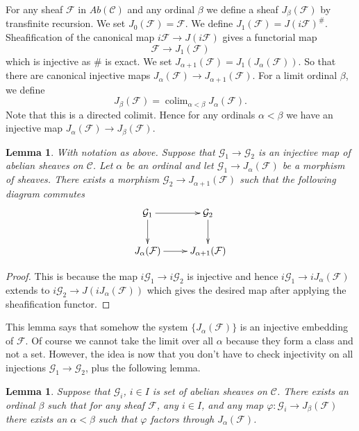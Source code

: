 \documentclass{stacks-project}
\theoremstyle{plain}
\newtheorem{lemma}[subsection]{Lemma}
\theoremstyle{definition}
\theoremstyle{remark}
\numberwithin{equation}{subsection}
\def\colim{\mathop{\mathrm{colim}}\nolimits}
\begin{document}
\medskip\noindent
For any sheaf $\mathcal{F}$ in $\textit{Ab}(\mathcal{C})$ and
any ordinal $\beta$ we define a sheaf
$J_\beta(\mathcal{F})$ by transfinite recursion.
We set $J_0(\mathcal{F}) = \mathcal{F}$.
We define $J_1(\mathcal{F}) = J(i\mathcal{F})^\#$.
Sheafification of the canonical map $i\mathcal{F} \to J(i\mathcal{F})$
gives a functorial map
$$
\mathcal{F} \longrightarrow J_1(\mathcal{F})
$$
which is injective as $\#$ is exact. We set
$J_{\alpha + 1}(\mathcal{F}) = J_1(J_\alpha(\mathcal{F}))$.
So that there are canonical injective maps
$J_\alpha(\mathcal{F}) \to J_{\alpha + 1}(\mathcal{F})$.
For a limit ordinal $\beta$, we define
$$
J_\beta(\mathcal{F}) = \colim_{\alpha < \beta} J_\alpha(\mathcal{F}).
$$
Note that this is a directed colimit. Hence for any ordinals $\alpha < \beta$
we have an injective map $J_\alpha(\mathcal{F}) \to J_\beta(\mathcal{F})$.

\begin{lemma}
\label{lemma-map-into-next-one}
With notation as above.
Suppose that $\mathcal{G}_1 \to \mathcal{G}_2$ is an injective
map of abelian sheaves on $\mathcal{C}$. Let $\alpha$ be an ordinal
and let $\mathcal{G}_1 \to J_\alpha(\mathcal{F})$ be a morphism
of sheaves. There exists a morphism $\mathcal{G}_2 \to
J_{\alpha + 1}(\mathcal{F})$ such that the following diagram commutes
$$
\xymatrix{
\mathcal{G}_1 \ar[d] \ar[r] & \mathcal{G}_2 \ar[d] \\
J_{\alpha}(\mathcal{F}) \ar[r] & J_{\alpha + 1}(\mathcal{F}) }
$$
\end{lemma}

\begin{proof}
This is because the map $i\mathcal{G}_1 \to i\mathcal{G}_2$ is injective
and hence $i\mathcal{G}_1 \to iJ_\alpha(\mathcal{F})$ extends to
$i\mathcal{G}_2 \to J(iJ_\alpha(\mathcal{F}))$ which gives the
desired map after applying the sheafification functor.
\end{proof}

\noindent
This lemma says that somehow the system $\{J_{\alpha}(\mathcal{F})\}$
is an injective embedding of $\mathcal{F}$. Of course
we cannot take the limit over all $\alpha$ because they form a class
and not a set. However, the idea is now that you don't have to check
injectivity on all injections $\mathcal{G}_1 \to \mathcal{G}_2$, plus
the following lemma.

\begin{lemma}
\label{lemma-map-into-smaller}
Suppose that $\mathcal{G}_i$, $i\in I$ is set of abelian sheaves
on $\mathcal{C}$. There exists an ordinal $\beta$ such that
for any sheaf $\mathcal{F}$, any $i\in I$, and any map
$\varphi : \mathcal{G}_i \to J_\beta(\mathcal{F})$ there exists an
$\alpha < \beta$ such that $ \varphi $ factors through
$J_\alpha(\mathcal{F})$.
\end{lemma}
\end{document}
